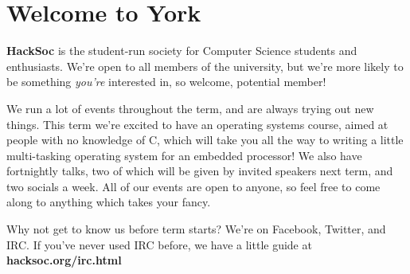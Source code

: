 \documentclass[10pt,a4paper,oneside]{article}
\newcommand{\week}[2]{
\mbox{}\\[-\baselineskip]
\begin{adjustwidth}{0.2cm}{0.2cm}
  \begingroup
  \renewcommand{\arraystretch}{1.5}
  \begin{tabularx}{\linewidth}{r|L}
    \multicolumn{2}{c}{\Large \fontspec{Sanchez Regular} #1}\\
    \hline #2
  \end{tabularx}
  \endgroup
\end{adjustwidth}
}
\begin{document}


\vspace{0.2cm}

\section*{Welcome to York}

\textbf{HackSoc} is the student-run society for Computer Science
students and enthusiasts. We're open to all members of the university,
but we're more likely to be something \textit{you're} interested in,
so welcome, potential member!

We run a lot of events throughout the term, and are always trying out
new things. This term we're excited to have an operating systems
course, aimed at people with no knowledge of C, which will take you
all the way to writing a little multi-tasking operating system for an
embedded processor! We also have fortnightly talks, two of which will
be given by invited speakers next term, and two socials a week. All of
our events are open to anyone, so feel free to come along to anything
which takes your fancy.

Why not get to know us before term starts? We're on Facebook, Twitter,
and IRC. If you've never used IRC before, we have a little guide at
\textbf{hacksoc.org/irc.html}
\end{document}
